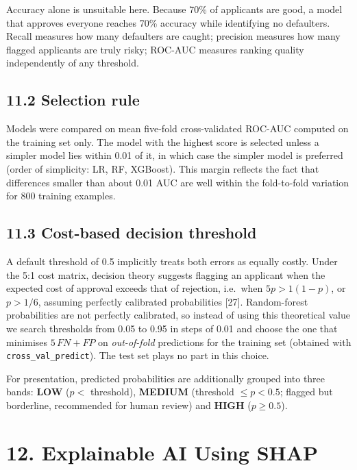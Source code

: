 \documentclass[
  11pt,
]{article}
\begin{document}
Accuracy alone is unsuitable here. Because 70\% of applicants are good,
a model that approves everyone reaches 70\% accuracy while identifying
no defaulters. Recall measures how many defaulters are caught; precision
measures how many flagged applicants are truly risky; ROC-AUC measures
ranking quality independently of any threshold.

\hypertarget{selection-rule}{%
\subsection{11.2 Selection rule}\label{selection-rule}}

Models were compared on mean five-fold cross-validated ROC-AUC computed
on the training set only. The model with the highest score is selected
unless a simpler model lies within 0.01 of it, in which case the simpler
model is preferred (order of simplicity: LR, RF, XGBoost). This margin
reflects the fact that differences smaller than about 0.01 AUC are well
within the fold-to-fold variation for 800 training examples.

\hypertarget{cost-based-decision-threshold}{%
\subsection{11.3 Cost-based decision
threshold}\label{cost-based-decision-threshold}}

A default threshold of 0.5 implicitly treats both errors as equally
costly. Under the 5:1 cost matrix, decision theory suggests flagging an
applicant when the expected cost of approval exceeds that of rejection,
i.e.~when \(5p > 1(1-p)\), or \(p > 1/6\), assuming perfectly calibrated
probabilities {[}27{]}. Random-forest probabilities are not perfectly
calibrated, so instead of using this theoretical value we search
thresholds from 0.05 to 0.95 in steps of 0.01 and choose the one that
minimises \(5\,FN + FP\) on \emph{out-of-fold} predictions for the
training set (obtained with \texttt{cross\_val\_predict}). The test set
plays no part in this choice.

For presentation, predicted probabilities are additionally grouped into
three bands: \textbf{LOW} (\(p <\) threshold), \textbf{MEDIUM}
(threshold \(\le p < 0.5\); flagged but borderline, recommended for
human review) and \textbf{HIGH} (\(p \ge 0.5\)).

\hypertarget{explainable-ai-using-shap}{%
\section{12. Explainable AI Using
SHAP}\label{explainable-ai-using-shap}}
\end{document}
